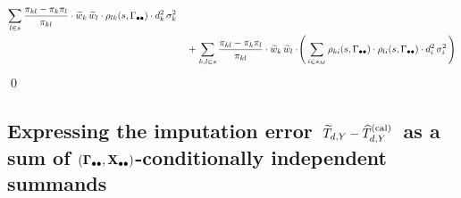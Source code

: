 \begin{enumerate}
\begin{eqnarray*}
        \underset{l \in {\color{black}s}}{\sum}\,
        \dfrac{\pi_{kl} - \pi_{k}\pi_{l}}{\pi_{kl}}
        \cdot
        \widetilde{w}_{k}\,\widetilde{w}_{l}
        \cdot
        \rho_{lk}(s,\Gamma_{\bullet\bullet})
        \cdot
        d_{k}^{2}\,
        \sigma_{k}^{2}
    \\
    &&
        \; + \;
        \underset{k,l \in s}{\sum}\,
        \dfrac{\pi_{kl} - \pi_{k}\pi_{l}}{\pi_{kl}}
        \cdot
        \widetilde{w}_{k}\,\widetilde{w}_{l}
        \cdot\!
        \left(\,
            \underset{i \in {\color{black}s_{M}} }{\sum}\,
            \rho_{ki}(s,\Gamma_{\bullet\bullet})
            \cdot
            \rho_{li}(s,\Gamma_{\bullet\bullet})
            \cdot
            d_{i}^{2}\,\sigma_{i}^{2}
            \,\right)
    \end{eqnarray*}
    \vskip -0.7cm
    \qed
\end{enumerate}


\clearpage
\subsection{Expressing the imputation error
\,$\widetilde{T}_{d,Y} - \widehat{T}^{\textnormal{(cal)}}_{d,Y}$\,
as a sum of $(\mathbf{\Gamma}_{\bullet\bullet},\mathbf{X}_{\bullet\bullet})$-conditionally independent summands}
\setcounter{theorem}{0}



